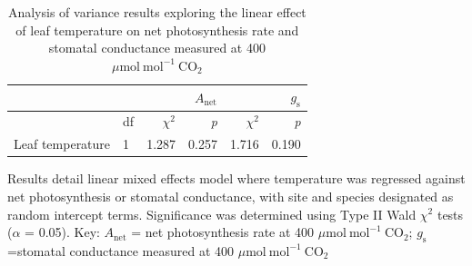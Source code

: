     \newpage
    \begin{table}[]
        \caption{Analysis of variance results exploring the linear effect of leaf temperature on net photosynthesis rate and stomatal conductance measured at 400 $\mu \mathrm{mol\ mol^{-1}\ CO_2}$}
        \centering
        \label{table:tab.b2}
        \begin{tabular}{p{4cm}p{0.5cm}p{3cm}p{}p{3cm}p{3cm}}
            && \multicolumn{2}{r}{$A_\mathrm{net}$} & \multicolumn{2}{r}{$g_\mathrm{s}$} \\
            \hline
            & df                    
            & \multicolumn{1}{r}{$\chi^2$}      & \multicolumn{1}{r}{\textit{p}}
            & \multicolumn{1}{r}{$\chi^2$}      & \multicolumn{1}{r}{\textit{p}}
            \\
            \hline
            
            Leaf temperature & 1    
            & \multicolumn{1}{r}{1.287}         & \multicolumn{1}{r}{0.257}      
            & \multicolumn{1}{r}{1.716}         & \multicolumn{1}{r}{0.190} \\

\end{tabular}%
\end{table}
\begin{singlespace}
\noindent Results detail linear mixed effects model where temperature was regressed against net photosynthesis or stomatal conductance, with site and species designated as random intercept terms. Significance was determined using Type II Wald $\chi^2$ tests ($\alpha$ = 0.05). Key: $A_\mathrm{net}$ = net photosynthesis rate at 400 $\mu \mathrm{mol\ mol^{-1}\ CO_2}$; $g_\mathrm{s}$=stomatal conductance measured at 400 $\mu \mathrm{mol\ mol^{-1}\ CO_2}$
\end{singlespace}
\clearpage

